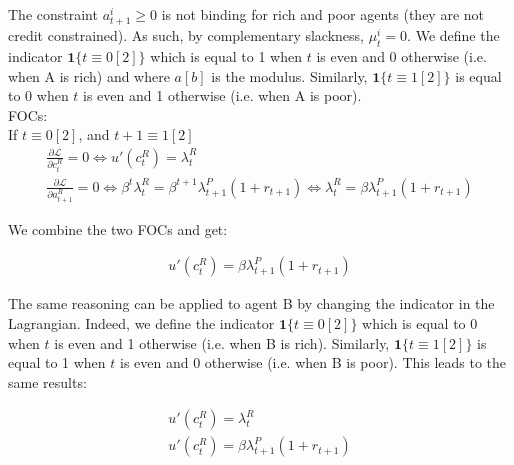 \documentclass{article}
\begin{document}
The constraint $a_{t+1}^i\geq 0$ is not binding for rich and poor agents (they are not credit constrained). As such, by complementary slackness, $\mu^i_{t}=0$.
We define the indicator $\mathbf{1}\{t\equiv0[2]\}$ which is equal to 1 when $t$ is even and 0 otherwise (i.e. when A is rich) and where $a[b]$ is the modulus. Similarly, $\mathbf{1}\{t\equiv1[2]\}$ is equal to 0 when $t$ is even and 1 otherwise (i.e. when A is poor).\\

FOCs: \\

If $t\equiv0[2]$, and $t+1\equiv1[2]$\\

\begin{gather*}
    \frac{\partial \mathcal{L}}{\partial c_t^R}=0\Leftrightarrow u'(c_t^R)=\lambda_t^R \\
    \frac{\partial \mathcal{L}}{\partial a_{t+1}^R}=0\Leftrightarrow \beta^t\lambda_{t}^R=\beta^{t+1}\lambda_{t+1}^P(1+r_{t+1})\Leftrightarrow \lambda_{t}^R=\beta\lambda_{t+1}^P(1+r_{t+1})
\end{gather*}

We combine the two FOCs and get:

\begin{gather*}
    u'(c_{t}^R)=\beta\lambda_{t+1}^P(1+r_{t+1})
\end{gather*}

The same reasoning can be applied to agent B by changing the indicator in the Lagrangian. Indeed, we define the indicator $\mathbf{1}\{t\equiv0[2]\}$ which is equal to 0 when $t$ is even and 1 otherwise (i.e. when B is rich). Similarly, $\mathbf{1}\{t\equiv1[2]\}$ is equal to 1 when $t$ is even and 0 otherwise (i.e. when B is poor). This leads to the same results:

\begin{gather*}
    u'(c_t^R)=\lambda_t^R \\
    u'(c_{t}^R)=\beta\lambda_{t+1}^P(1+r_{t+1})
\end{gather*}
\end{document}

